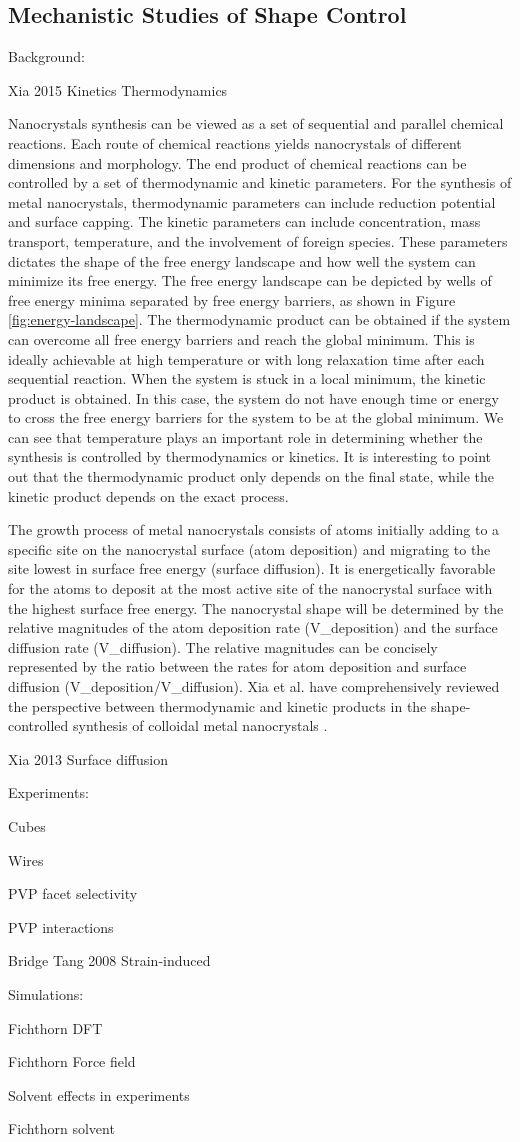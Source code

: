 \subsection{Mechanistic Studies of Shape Control}

Background:

Xia 2015 Kinetics Thermodynamics

Nanocrystals synthesis can be viewed as a set of sequential and parallel chemical reactions.
Each route of chemical reactions yields nanocrystals of different dimensions and morphology.
The end product of chemical reactions can be controlled by a set of thermodynamic and kinetic parameters.
For the synthesis of metal nanocrystals, thermodynamic parameters can include reduction potential and surface capping.
The kinetic parameters can include concentration, mass transport, temperature, and the involvement of foreign species.
These parameters dictates the shape of the free energy landscape and how well the system can minimize its free energy.
The free energy landscape can be depicted by wells of free energy minima separated by free energy barriers, as shown in Figure \ref{fig:energy-landscape}.
The thermodynamic product can be obtained if the system can overcome all free energy barriers and reach the global minimum.
This is ideally achievable at high temperature or with long relaxation time after each sequential reaction.
When the system is stuck in a local minimum, the kinetic product is obtained.
In this case, the system do not have enough time or energy to cross the free energy barriers for the system to be at the global minimum.
We can see that temperature plays an important role in determining whether the synthesis is controlled by thermodynamics or kinetics.
It is interesting to point out that the thermodynamic product only depends on the final state, while the kinetic product depends on the exact process.

The growth process of metal nanocrystals consists of atoms initially adding to a specific site on the nanocrystal surface (atom deposition) and migrating to the site lowest in surface free energy (surface diffusion).
It is energetically favorable for the atoms to deposit at the most active site of the nanocrystal surface with the highest surface free energy.
The nanocrystal shape will be determined by the relative magnitudes of the atom deposition rate (V_{deposition}) and the surface diffusion rate (V_{diffusion}).
The relative magnitudes can be concisely represented by the ratio between the rates for atom deposition and surface diffusion (V_{deposition}/V_{diffusion}).
Xia et al. have comprehensively reviewed the perspective between thermodynamic and kinetic products in the shape-controlled synthesis of colloidal metal nanocrystals \cite{Xia_2015}.

Xia 2013 Surface diffusion

Experiments:

Cubes

Wires

PVP facet selectivity

PVP interactions

Bridge Tang 2008 Strain-induced

Simulations:

Fichthorn DFT

Fichthorn Force field

Solvent effects in experiments

Fichthorn solvent
  
  
  
  